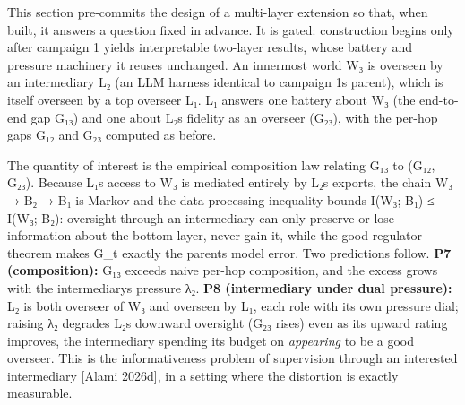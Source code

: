 \documentclass[11pt]{article}
\begin{document}
This section pre-commits the design of a multi-layer extension so that,
when built, it answers a question fixed in advance. It is gated:
construction begins only after campaign 1 yields interpretable two-layer
results, whose battery and pressure machinery it reuses unchanged. An
innermost world W₃ is overseen by an intermediary L₂ (an LLM harness
identical to campaign 1\textquotesingle s parent), which is itself
overseen by a top overseer L₁. L₁ answers one battery about W₃ (the
end-to-end gap G₁₃) and one about L₂\textquotesingle s fidelity as an
overseer (G₂₃), with the per-hop gaps G₁₂ and G₂₃ computed as before.

The quantity of interest is the empirical composition law relating G₁₃
to (G₁₂, G₂₃). Because L₁\textquotesingle s access to W₃ is mediated
entirely by L₂\textquotesingle s exports, the chain W₃ → B₂ → B₁ is
Markov and the data processing inequality bounds I(W₃; B₁) ≤ I(W₃; B₂):
oversight through an intermediary can only preserve or lose information
about the bottom layer, never gain it, while the good-regulator theorem
makes G\_t exactly the parent\textquotesingle s model error. Two
predictions follow. \textbf{P7 (composition):} G₁₃ exceeds naive per-hop
composition, and the excess grows with the
intermediary\textquotesingle s pressure λ₂. \textbf{P8 (intermediary
under dual pressure):} L₂ is both overseer of W₃ and overseen by L₁,
each role with its own pressure dial; raising λ₂ degrades
L₂\textquotesingle s downward oversight (G₂₃ rises) even as its upward
rating improves, the intermediary spending its budget on \emph{appearing}
to be a good overseer. This is the
informativeness problem of supervision through an interested
intermediary {[}Alami 2026d{]}, in a setting where the distortion is
exactly measurable.
\end{document}
